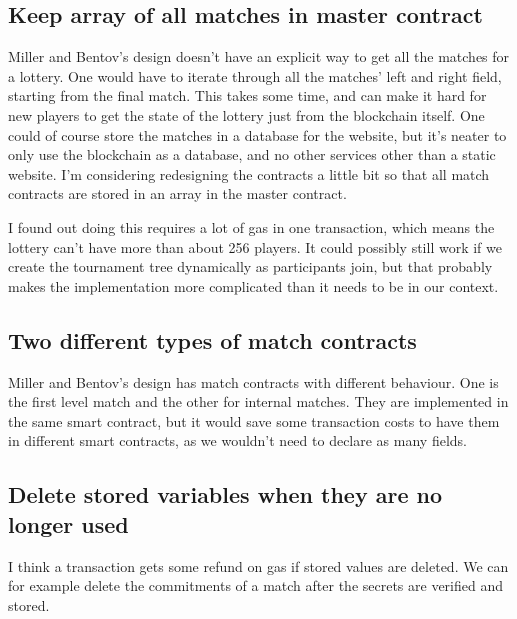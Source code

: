 \subsection{Keep array of all matches in master contract}
Miller and Bentov's design doesn't have an explicit way to get all the matches for a lottery. One would have to iterate through all the matches' left and right field, starting from the final match. This takes some time, and can make it hard for new players to get the state of the lottery just from the blockchain itself. One could of course store the matches in a database for the website, but it's neater to only use the blockchain as a database, and no other services other than a static website. I'm considering redesigning the contracts a little bit so that all match contracts are stored in an array in the master contract.

I found out doing this requires a lot of gas in one transaction, which means the lottery can't have more than about 256 players. It could possibly still work if we create the tournament tree dynamically as participants join, but that probably makes the implementation more complicated than it needs to be in our context.

\subsection{Two different types of match contracts}
Miller and Bentov's design has match contracts with different behaviour. One is the first level match and the other for internal matches. They are implemented in the same smart contract, but it would save some transaction costs to have them in different smart contracts, as we wouldn't need to declare as many fields.

\subsection{Delete stored variables when they are no longer used}
I think a transaction gets some refund on gas if stored values are deleted. We can for example delete the commitments of a match after the secrets are verified and stored.